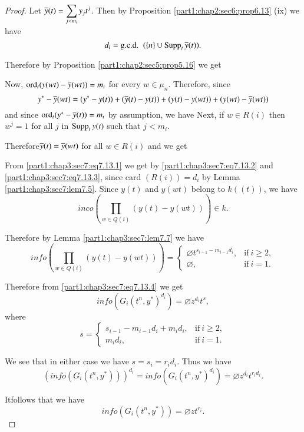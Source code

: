 \begin{proof}
  Let $\overline{y}(t)= \displaystyle{\sum_{j < m_i} y_j t^j}$. Then by Proposition \ref{part1:chap2:sec6:prop6.13} (ix) we have
$$
d_i = \text{{g.c.d.}\kern.3em}~ (\{ n\} \cup \operatorname{Supp}_t \overline{y}(t)).
$$

Therefore by Proposition \ref{part1:chap2:sec5:prop5.16} we get

Now, $\operatorname{ord}_t (y(wt)- \overline{y} (wt))= m_i$ for every $w \in \mu_n$. Therefore, since
$$
y^* - \overline{y} (wt) = (y^* - y(t)) + (\overline{y}(t)- y(t))+ (y(t)- y(wt))+ (y(wt)- \overline{y}(wt))
$$
and since $\operatorname{ord}_t(y^*- \overline{y}(t))=m_i$ by assumption, we have
Next, if $w \in R(i)$ then $w^j=1$ for all $j$ in $\operatorname{Supp}_t y(t)$ such that $j< m_i$.

Therefore\pageoriginale $\overline{y}(t)= \overline{y} (wt)$ for all $w \in R(i)$ and we get

From \ref{part1:chap3:sec7:eq7.13.1} we get
by \ref{part1:chap3:sec7:eq7.13.2} and \ref{part1:chap3:sec7:eq7.13.3}, since card $(R(i))=d_i$ by Lemma \ref{part1:chap3:sec7:lem7.5}. Since $y(t)$ and $y(wt)$ belong to $k((t))$, we have
$$
inco \left( \prod_{w \in Q(i)} (y(t)- y(wt))\right) \in k.
$$


Therefore by Lemma \ref{part1:chap3:sec7:lem7.7} we have
$$
info \left(\prod_{w \in Q(i)} (y(t)- y(wt))\right) = 
\begin{cases}
  \diameter t^{s_{i-1}-m_{i-1} d_i}, & \text{if}~ i \geq 2,\\
  \diameter , & \text{if}~ i=1.
\end{cases}
$$

Therefore from \ref{part1:chap3:sec7:eq7.13.4} we get
$$
info (G_i (t^n, y^*)^{d_i}) = \diameter z^{d_i} t^s, 
$$
where
$$s=
\begin{cases}
  s_{i-1} - m_{i-1} d_i+ m_i d_i, & \text{if}~ i \geq 2,\\
m_i d_i, & \text{if}~ i=1.
\end{cases}
$$

We see that in either case we have $s= s_i = r_i d_i$. Thus we have
$$
(info (G_i (t^n, y^*)))^{d_i} = info (G_i (t^n, y^*)^{d_i})= \diameter z^{d_i} t^{r_i d_i}. 
$$

It\pageoriginale follows that we have
$$
info (G_i (t^n, y^*)) = \diameter z t^{r_i}.
$$
\end{proof}


